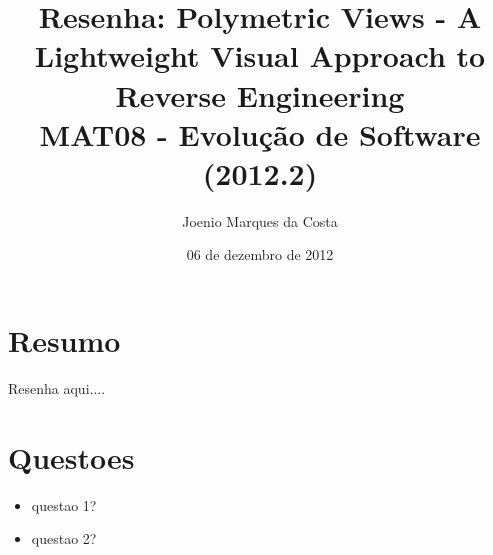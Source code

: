 \documentclass[12pt]{article}
\title{Resenha: Polymetric Views - A Lightweight Visual Approach to Reverse Engineering\cite{PolymetricViews} \\
 \large MAT08 - Evolução de Software (2012.2)}
\author{Joenio Marques da Costa}
\date{06 de dezembro de 2012}
\begin{document}
\maketitle

\section{Resumo}

Resenha aqui....

\section{Questoes}

\begin{itemize}
  \item questao 1?
  \item questao 2?
\end{itemize}


\end{document}
